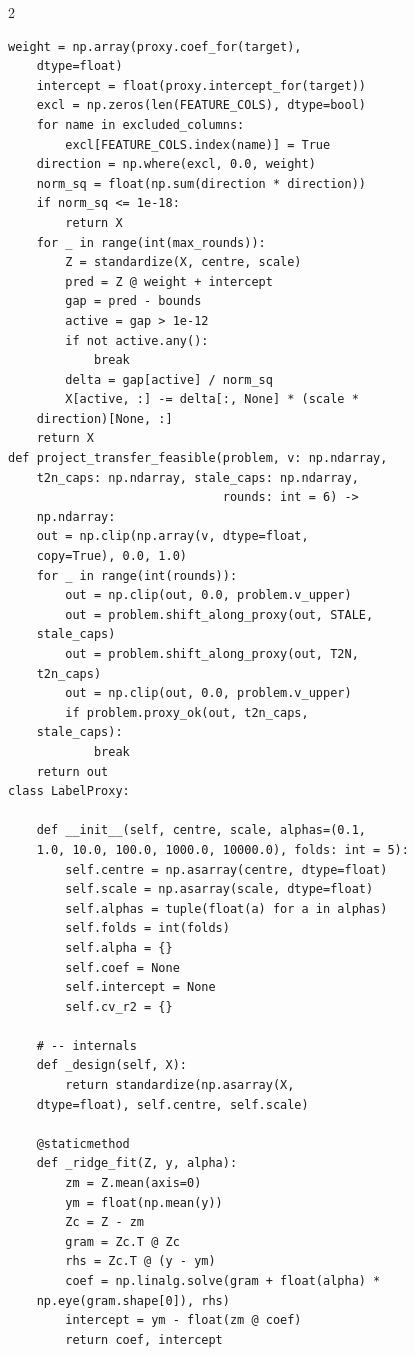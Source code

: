 \begin{multicols}{2}
\begin{Verbatim}[fontsize=\scriptsize]
    weight = np.array(proxy.coef_for(target),
    dtype=float)
    intercept = float(proxy.intercept_for(target))
    excl = np.zeros(len(FEATURE_COLS), dtype=bool)
    for name in excluded_columns:
        excl[FEATURE_COLS.index(name)] = True
    direction = np.where(excl, 0.0, weight)
    norm_sq = float(np.sum(direction * direction))
    if norm_sq <= 1e-18:
        return X
    for _ in range(int(max_rounds)):
        Z = standardize(X, centre, scale)
        pred = Z @ weight + intercept
        gap = pred - bounds
        active = gap > 1e-12
        if not active.any():
            break
        delta = gap[active] / norm_sq
        X[active, :] -= delta[:, None] * (scale *
    direction)[None, :]
    return X
def project_transfer_feasible(problem, v: np.ndarray,
    t2n_caps: np.ndarray, stale_caps: np.ndarray,
                              rounds: int = 6) ->
    np.ndarray:
    out = np.clip(np.array(v, dtype=float,
    copy=True), 0.0, 1.0)
    for _ in range(int(rounds)):
        out = np.clip(out, 0.0, problem.v_upper)
        out = problem.shift_along_proxy(out, STALE,
    stale_caps)
        out = problem.shift_along_proxy(out, T2N,
    t2n_caps)
        out = np.clip(out, 0.0, problem.v_upper)
        if problem.proxy_ok(out, t2n_caps,
    stale_caps):
            break
    return out
class LabelProxy:

    def __init__(self, centre, scale, alphas=(0.1,
    1.0, 10.0, 100.0, 1000.0, 10000.0), folds: int = 5):
        self.centre = np.asarray(centre, dtype=float)
        self.scale = np.asarray(scale, dtype=float)
        self.alphas = tuple(float(a) for a in alphas)
        self.folds = int(folds)
        self.alpha = {}
        self.coef = None
        self.intercept = None
        self.cv_r2 = {}

    # -- internals
    def _design(self, X):
        return standardize(np.asarray(X,
    dtype=float), self.centre, self.scale)

    @staticmethod
    def _ridge_fit(Z, y, alpha):
        zm = Z.mean(axis=0)
        ym = float(np.mean(y))
        Zc = Z - zm
        gram = Zc.T @ Zc
        rhs = Zc.T @ (y - ym)
        coef = np.linalg.solve(gram + float(alpha) *
    np.eye(gram.shape[0]), rhs)
        intercept = ym - float(zm @ coef)
        return coef, intercept


\end{Verbatim}
\end{multicols}
